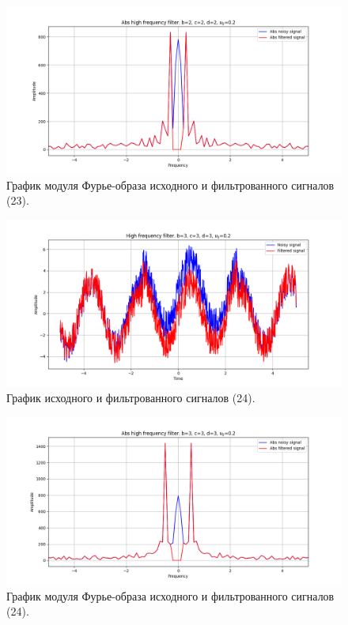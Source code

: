 \documentclass[a4paper, 12pt]{article}
\begin{document}
    \begin{figure}[!htb]
        \centering
        \includegraphics[scale=0.48]{23_abs_u_U_nolow.png}
        \captionsetup{skip=0pt}
        \caption{График модуля Фурье-образа исходного и фильтрованного сигналов (23).}
        \label{fig:fig_d}
    \end{figure}
    \begin{figure}[!htb]
        \centering
        \includegraphics[scale=0.48]{24_u_flt_u_nolow.png}
        \captionsetup{skip=0pt}
        \caption{График исходного и фильтрованного сигналов (24).}
        \label{fig:fig_e}
    \end{figure}
    \newpage
    \begin{figure}[!htb]
        \centering
        \includegraphics[scale=0.48]{24_abs_u_U_nolow.png}
        \captionsetup{skip=0pt}
        \caption{График модуля Фурье-образа исходного и фильтрованного сигналов (24).}
        \label{fig:fig_f}
    \end{figure}
\end{document}

